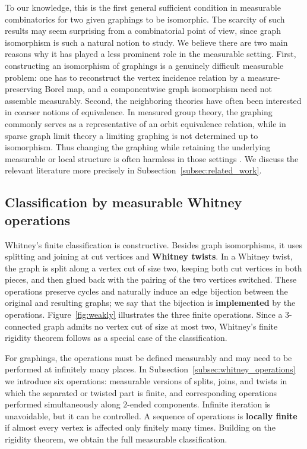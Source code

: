 \documentclass{article}
\theoremstyle{plain}
\theoremstyle{definition}
\begin{document}
To our knowledge, this is the first general sufficient condition in measurable combinatorics for two given graphings to be isomorphic. The scarcity of such results may seem surprising from a combinatorial point of view, since graph isomorphism is such a natural notion to study. We believe there are two main reasons why it has played a less prominent role in the measurable setting. First, constructing an isomorphism of graphings is a genuinely difficult measurable problem: one has to reconstruct the vertex incidence relation by a measure-preserving Borel map, and a componentwise graph isomorphism need not assemble measurably. Second, the neighboring theories have often been interested in coarser notions of equivalence. In measured group theory, the graphing commonly serves as a representative of an orbit equivalence relation, while in sparse graph limit theory a limiting graphing is not determined up to isomorphism. Thus changing the graphing while retaining the underlying measurable or local structure is often harmless in those settings \cite{kechris2004topics, kechris2024theory, lovasz2012large}. We discuss the relevant literature more precisely in Subsection~\ref{subsec:related_work}.



\subsection{Classification by measurable Whitney operations}

Whitney's finite classification is constructive. Besides graph isomorphisms, it uses splitting and joining at cut vertices and \textbf{Whitney twists}. In a Whitney twist, the graph is split along a vertex cut of size two, keeping both cut vertices in both pieces, and then glued back with the pairing of the two vertices switched. These operations preserve cycles and naturally induce an edge bijection between the original and resulting graphs; we say that the bijection is \textbf{implemented} by the operations. Figure~\ref{fig:weakly} illustrates the three finite operations. Since a $3$-connected graph admits no vertex cut of size at most two, Whitney's finite rigidity theorem follows as a special case of the classification.

For graphings, the operations must be defined measurably and may need to be performed at infinitely many places. In Subsection~\ref{subsec:whitney_operations} we introduce six operations: measurable versions of splits, joins, and twists in which the separated or twisted part is finite, and corresponding operations performed simultaneously along $2$-ended components. Infinite iteration is unavoidable, but it can be controlled. A sequence of operations is \textbf{locally finite} if almost every vertex is affected only finitely many times. Building on the rigidity theorem, we obtain the full measurable classification.
\end{document}
